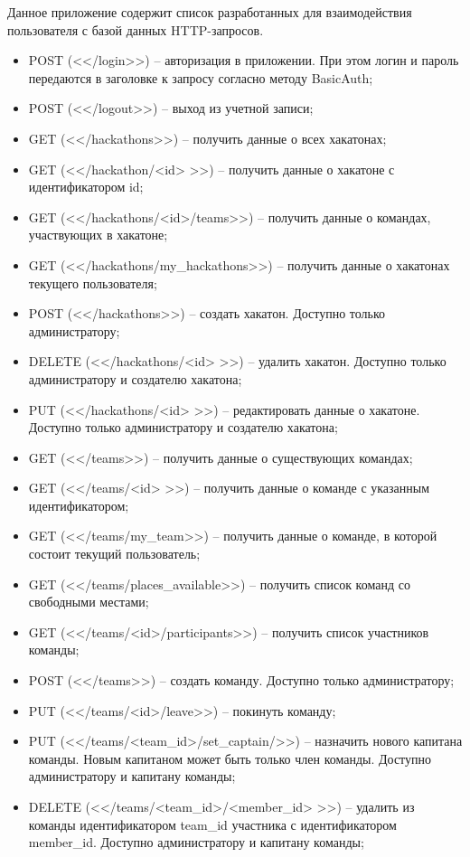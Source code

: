 Данное приложение содержит список разработанных для взаимодействия пользователя с базой данных HTTP-запросов.

\begin{itemize}
    \item POST (<</login>>) -- авторизация в приложении. При этом логин и пароль передаются в заголовке к запросу согласно методу BasicAuth\cite{basicauth};
    \item POST (<</logout>>) -- выход из учетной записи;
    \item GET (<</hackathons>>) -- получить данные о всех хакатонах;
    \item GET (<</hackathon/<id> >>) -- получить данные о хакатоне с идентификатором id;
    \item GET (<</hackathons/<id>/teams>>) -- получить данные о командах, 
    участвующих в хакатоне;
    \item GET (<</hackathons/my\_hackathons>>) -- получить данные о хакатонах текущего пользователя;
    \item POST (<</hackathons>>) -- создать хакатон. Доступно только администратору;
    \item DELETE (<</hackathons/<id> >>) -- удалить хакатон. Доступно только администратору и создателю хакатона;
    \item PUT (<</hackathons/<id> >>) -- редактировать данные о хакатоне. Доступно только администратору и создателю хакатона;
    \item GET (<</teams>>) -- получить данные о существующих командах;
    \item GET (<</teams/<id> >>) -- получить данные о команде с указанным идентификатором;
    \item GET (<</teams/my\_team>>) -- получить данные о команде, в которой состоит текущий пользователь;
    \item GET (<</teams/places\_available>>) -- получить список команд со свободными местами;
    \item GET (<</teams/<id>/participants>>) -- получить список участников команды;
    \item POST (<</teams>>) -- создать команду. Доступно только администратору;
    \item PUT (<</teams/<id>/leave>>) -- покинуть команду;
    \item PUT (<</teams/<team\_id>/set\_captain/>>) -- назначить нового капитана команды. Новым капитаном может быть только член команды. Доступно администратору и капитану команды;
    \item DELETE (<</teams/<team\_id>/<member\_id> >>) -- удалить из команды идентификатором team\_id участника с идентификатором member\_id. Доступно администратору и капитану команды;

\end{itemize}
